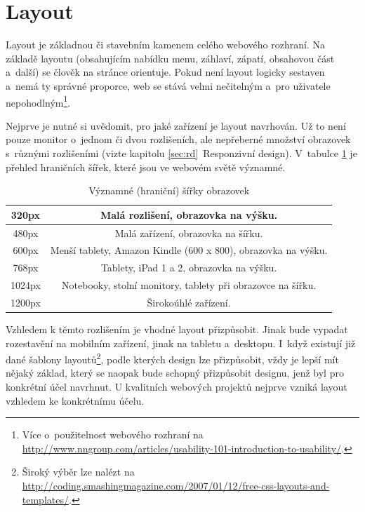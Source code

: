 \documentclass[thesis=B,czech]{FITthesis}[2012/06/26]
\begin{document}
\section{Layout}



Layout je základnou či stavebním kamenem celého webového rozhraní. Na základě layoutu (obsahujícím nabídku menu, záhlaví, zápatí, obsahovou část a~další) se člověk na stránce orientuje. Pokud není layout logicky sestaven a~nemá ty správné proporce, web se stává velmi nečitelným a~pro uživatele nepohodlným\footnote{Více o~použitelnost webového rozhraní na \url{http://www.nngroup.com/articles/usability-101-introduction-to-usability/}.}.

Nejprve je nutné si uvědomit, pro jaké zařízení je layout navrhován. Už to není pouze monitor o~jednom či dvou rozlišeních, ale nepřeberné množství obrazovek s~různými rozlišeními (vizte kapitolu \ref{sec:rd}~Responzivní design). V~tabulce \ref{tab:sirky} je přehled hraničních šířek, které jsou ve webovém světě významné.

\begin{table}\centering
 	\caption[Významné (hraniční) šířky]{Významné (hraniční) šířky obrazovek\cite{res}}\label{tab:sirky}%
 	\begin{tabular}{|c|c|}\hline
		320px & Malá rozlišení, obrazovka na výšku.\tabularnewline
		\hline 
		 480px & Malá zařízení, obrazovka na šířku.\tabularnewline
		\hline 
		600px & Menší tablety, Amazon Kindle (600 x 800), obrazovka na výšku.\tabularnewline
		\hline 
		768px & Tablety, iPad 1 a 2, obrazovka na výšku.\tabularnewline
		\hline 
		1024px & Notebooky, stolní monitory, tablety při obrazovce na šířku.\tabularnewline
		\hline 
		1200px & Širokoúhlé zařízení.\tabularnewline
		\hline 
 	\end{tabular}
\end{table}

Vzhledem k těmto rozlišením je vhodné layout přizpůsobit. Jinak bude vypadat rozestavění na mobilním zařízení, jinak na tabletu a~desktopu. I~když existují již dané šablony layoutů\footnote{Široký výběr lze nalézt na \url{http://coding.smashingmagazine.com/2007/01/12/free-css-layouts-and-templates/}.}, podle kterých design lze přizpůsobit, vždy je lepší mít nějaký základ, který se naopak bude schopný přizpůsobit designu, jenž byl pro konkrétní účel navrhnut. U kvalitních webových projektů nejprve vzniká layout vzhledem ke konkrétnímu účelu.
\end{document}
